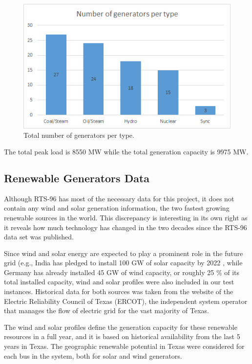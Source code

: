 \documentclass[12pt,LUDisStyle,twosided]{book}
\begin{document}
\begin{figure}[H] 
  \includegraphics[width=\textwidth,height=\textheight,keepaspectratio]{numberGeneratorsPerType.png}
  \caption{Total number of generators per type.}
  \label{fig:generatorDistribution}
\end{figure}



The total peak load is 8550 MW while the total generation capacity is 9975 MW. 

\subsection{Renewable Generators Data}

Although RTS-96 has most of the necessary data for this project, it does not contain any wind and solar generation information, the two fastest growing renewable sources in the world. This discrepancy is interesting in its own right as it reveals how much technology has changed in the two decades since the RTS-96 data set was published.

Since wind and solar energy are expected to play a prominent role in the future grid (e.g., India has pledged to install 100 GW of solar capacity by 2022 \cite{mitindia}, while Germany has already installed 45 GW of wind capacity, or roughly 25 \% of its total installed capacity\cite{fraunpower}, wind and solar profiles were also included in our test instances. Historical data for both sources was taken from the website of the Electric Reliability Council of Texas (ERCOT), the independent system operator that manages the flow of electric grid for the vast majority of Texas.  

The wind and solar profiles define the generation capacity for these renewable resources in a full year, and it is based on historical availability from the last 5 years in Texas. The geographic renewable potential in Texas were considered for each bus in the system, both for solar and wind generators.
\end{document}
